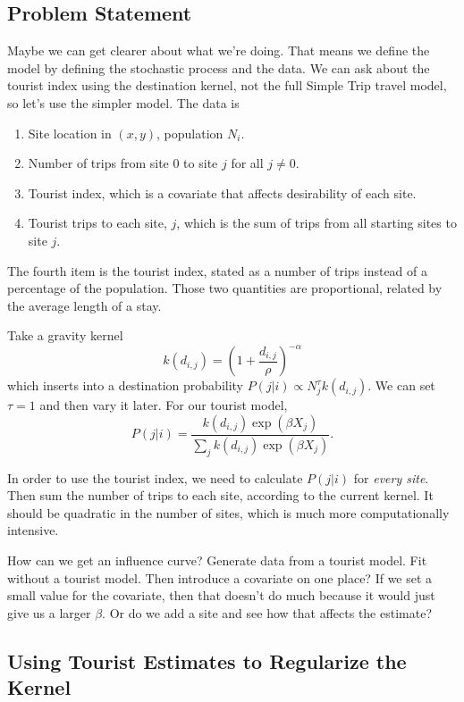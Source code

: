 \documentclass{article}
\begin{document}
\subsection{Problem Statement}

Maybe we can get clearer about what we're doing. That means we define the model by defining the stochastic process and the data. We can ask about the tourist index using the destination kernel, not the full Simple Trip travel model, so let's use the simpler model. The data is
\begin{enumerate}
  \item Site location in $(x,y)$, population $N_i$.
  \item Number of trips from site 0 to site $j$ for all $j\ne 0$.
  \item Tourist index, which is a covariate that affects desirability of each site.
  \item Tourist trips to each site, $j$, which is the sum of trips from all starting sites to site $j$.
  \end{enumerate}
The fourth item is the tourist index, stated as a number of trips instead of a percentage of the population. Those two quantities are proportional, related by the average length of a stay.

Take a gravity kernel
\begin{equation}
k(d_{i,j}) = \left(1+\frac{d_{i,j}}{\rho}\right)^{-\alpha}
\end{equation}
which inserts into a destination probability $P(j|i)\propto N_j^{\tau}k(d_{i,j})$. We can set $\tau=1$ and then vary it later. For our tourist model,
\begin{equation}
  P(j|i) = \frac{k(d_{i,j})\exp(\beta X_j)}{\sum_{j} k(d_{i,j})\exp(\beta X_j)}.
\end{equation}

In order to use the tourist index, we need to calculate $P(j|i)$ for \emph{every site}. Then sum the number of trips to each site, according to the current kernel. It should be quadratic in the number of sites, which is much more computationally intensive.

How can we get an influence curve? Generate data from a tourist model. Fit without a tourist model. Then introduce a covariate on one place? If we set a small value for the covariate, then that doesn't do much because it would just give us a larger $\beta$. Or do we add a site and see how that affects the estimate?


\subsection{Using Tourist Estimates to Regularize the Kernel}
\end{document}
